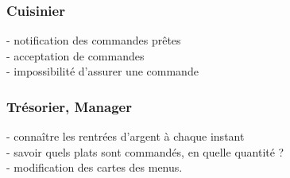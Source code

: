 \documentclass[11pt]{article}
\begin{document}
\subsubsection{Cuisinier}
- notification des commandes prêtes\\
- acceptation de commandes\\
- impossibilité d'assurer une commande\\
\subsubsection{Trésorier, Manager}
- connaître les rentrées d'argent à chaque instant\\
- savoir quels plats sont commandés, en quelle quantité ?\\
- modification des cartes des menus.\\
\end{document}
